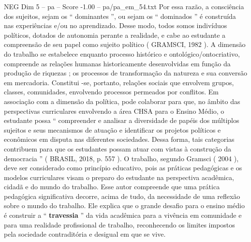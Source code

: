 \begin{textsample}{NEG Dim 5 – pa – Score -1.00 – pa/pa\_em\_54.txt}
Por essa razão, a consciência dos sujeitos, sejam os “ dominantes ”, ou sejam os “ dominados ” é construída nas experiências e/ou no aprendizado.
Desse modo, todos somos indivíduos políticos, dotados de autonomia perante a realidade, e cabe ao estudante a compreensão de seu papel como sujeito político ( GRAMSCI, 1982 ).
A dimensão do trabalho se estabelece enquanto processo histórico e ontológico/ontocriativo, compreende as relações humanas historicamente desenvolvidas em função da produção de riquezas ; os processos de transformação da natureza e sua conversão em mercadoria.
Constitui -se, portanto, relações sociais que envolvem grupos, classes, comunidades, envolvendo processos permeados por conflitos.
Em associação com a dimensão da política, pode colaborar para que, no âmbito das perspectivas curriculares envolvendo a área CHSA para o Ensino Médio, o estudante possa “ compreender e analisar a diversidade de papéis dos múltiplos sujeitos e seus mecanismos de atuação e identificar os projetos políticos e econômicos em disputa nas diferentes sociedades.
Dessa forma, tais categorias contribuem para que os estudantes possam atuar com vistas à construção da democracia ” ( BRASIL, 2018, p. 557 ).
O trabalho, segundo Gramsci ( 2004 ), deve ser considerado como princípio educativo, pois as práticas pedagógicas e os modelos curriculares visam o preparo do estudante na perspectiva acadêmica, cidadã e do mundo do trabalho.
Esse autor compreende que uma prática pedagógica significativa decorre, acima de tudo, da necessidade de uma reflexão sobre o mundo do trabalho.
Ele explica que o grande desafio para o ensino médio é construir a “ \textbf{travessia} ” da vida acadêmica para a vivência em comunidade e para uma realidade profissional de trabalho, reconhecendo os limites impostos pela sociedade contraditória e desigual em que se vive.

\end{textsample}
